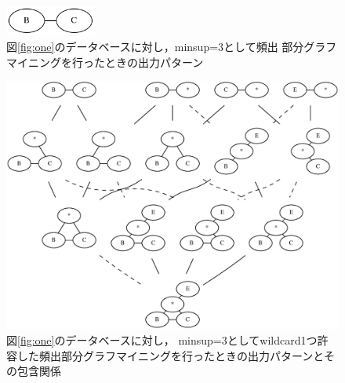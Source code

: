 \documentclass[12pt,fleqn]{jsotsuron}
\begin{document}
\begin{figure}[t]
    \begin{minipage}
        \begin{center}
            \includegraphics[width=30mm,bb=0 0 179 59]{fig/g.png}
        \end{center}
    \end{minipage}
    \caption{図\ref{fig:one}のデータベースに対し，minsup=3として頻出
      部分グラフマイニングを行ったときの出力パターン}
    \label{fig:two}
\end{figure}
\fi
\begin{figure}[t]
    \begin{center}
        \includegraphics[scale = 0.3]{fig/gw.eps}
    \end{center}
    \caption{図\ref{fig:one}のデータベースに対し，
      minsup=3としてwildcard1つ許容した頻出部分グラフマイニングを行ったときの出力パターンとその包含関係}
    \label{fig:three}
\end{figure}
\end{document}
